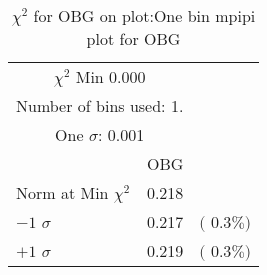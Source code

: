  \begin{table}[h!]\centering
 {\small{
 \begin{tabular}{||l||r||r||}
 \hline
 \hline
\multicolumn{2}{||c||}{$\chi^{2}$ Min   0.000} & \\
 \multicolumn{2}{||c||}{Number of bins used:   1.} & \\
\multicolumn{2}{||c||}{One $\sigma$:    0.001} & \\
 \hline
 \hline
    & OBG & \\
Norm at Min $\chi^{2}$  &   0.218 & \\
$-1$ $\sigma$ &   0.217  &  $($  0.3$\%)$  \\
$+1$ $\sigma$ &   0.219  &  $($  0.3$\%)$  \\
 \hline
 \hline
 \end{tabular}
 \caption{$\chi^{2}$ for OBG on plot:One bin mpipi plot for OBG}
 \label{tab-chiobg}
 }}
 \end{table}
 \endinput

